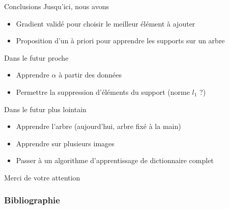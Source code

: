 \begin{frame}{Conclusions}
Jusqu'ici, nous avons
\begin{itemize}
\item[\cmark] Gradient validé pour choisir le meilleur élément à ajouter
\item[\cmark] Proposition d'un à priori pour apprendre les supports sur un arbre
\end{itemize}
Dans le futur proche
\begin{itemize}
\item Apprendre $\alpha$ à partir des données
\item Permettre la suppression d'éléments du support (norme $l_1$ ?)
\end{itemize}
Dans le futur plus lointain
\begin{itemize}
\item[\textcolor{purple}{\ding{43}}] Apprendre l'arbre (aujourd'hui, arbre fixé à la main)
\item[\textcolor{purple}{\ding{43}}] Apprendre sur plusieurs images
\item[\textcolor{purple}{\ding{43}}] Passer à un algorithme d'apprentissage de dictionnaire complet
\end{itemize}
\vfill
\hfill Merci de votre attention
\end{frame}

\appendix

\begin{frame}
\frametitle{Bibliographie}
\printbibliography[heading=none]
\end{frame}


